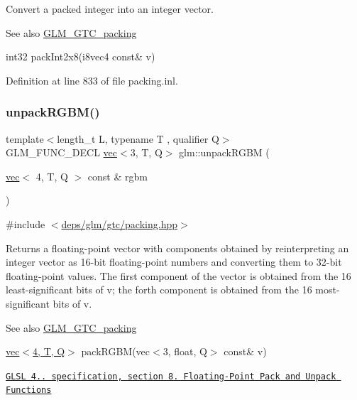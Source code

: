 Convert a packed integer into an integer vector.

\begin{DoxySeeAlso}{See also}
\hyperlink{group__gtc__packing}{G\+L\+M\+\_\+\+G\+T\+C\+\_\+packing} 

int32 pack\+Int2x8(i8vec4 const\& v) 
\end{DoxySeeAlso}


Definition at line 833 of file packing.\+inl.

\mbox{\label{group__gtc__packing_ga5c1ec97894b05ea21a05aea4f0204a02}} 
\subsubsection{\texorpdfstring{unpack\+R\+G\+B\+M()}{unpackRGBM()}}
{\footnotesize\ttfamily template$<$length\+\_\+t L, typename T , qualifier Q$>$ \\
G\+L\+M\+\_\+\+F\+U\+N\+C\+\_\+\+D\+E\+CL \hyperlink{structglm_1_1vec}{vec}$<$3, T, Q$>$ glm\+::unpack\+R\+G\+BM (\begin{DoxyParamCaption}\item[{\hyperlink{structglm_1_1vec}{vec}$<$ 4, T, Q $>$ const \&}]{rgbm }\end{DoxyParamCaption})}



{\ttfamily \#include $<$\hyperlink{gtc_2packing_8hpp}{deps/glm/gtc/packing.\+hpp}$>$}

Returns a floating-\/point vector with components obtained by reinterpreting an integer vector as 16-\/bit floating-\/point numbers and converting them to 32-\/bit floating-\/point values. The first component of the vector is obtained from the 16 least-\/significant bits of v; the forth component is obtained from the 16 most-\/significant bits of v.

\begin{DoxySeeAlso}{See also}
\hyperlink{group__gtc__packing}{G\+L\+M\+\_\+\+G\+T\+C\+\_\+packing} 

\hyperlink{structglm_1_1vec_3_014_00_01T_00_01Q_01_4}{vec$<$4, T, Q$>$} pack\+R\+G\+B\+M(vec$<$3, float, Q$>$ const\& v) 

\href{http://www.opengl.org/registry/doc/GLSLangSpec.4.20.8.pdf}{\tt G\+L\+SL 4.. specification, section 8. Floating-\/\+Point Pack and Unpack Functions} 
\end{DoxySeeAlso}


